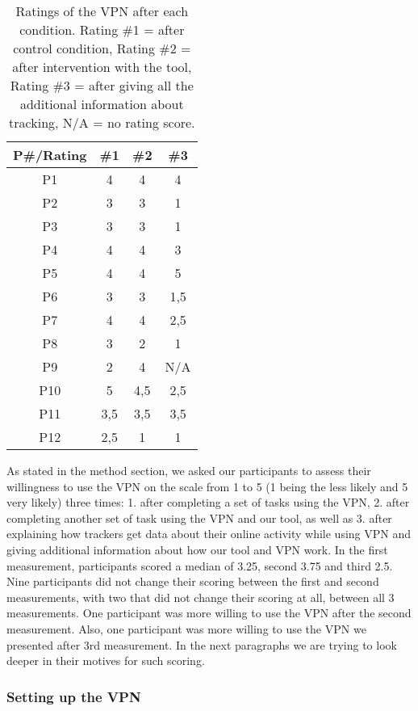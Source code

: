 \begin{table}[h!]
\centering
\begin{tabular}{|c c c c|} 
 \hline
P\#/Rating & \#1 & \#2 & \#3 \\
\hline
P1 & 4 & 4 & 4\\
P2 & 3 & 3 & 1\\
P3 & 3 & 3 & 1\\
P4 & 4 & 4 & 3\\
P5 & 4 & 4 & 5\\
P6 & 3 & 3 & 1,5\\
P7 & 4 & 4 & 2,5\\
P8 & 3 & 2 & 1\\
P9 & 2 & 4 & N/A\\
P10 & 5 & 4,5 & 2,5\\
P11 & 3,5 & 3,5 & 3,5\\
P12 & 2,5 & 1 & 1 \\
 \hline
\end{tabular}
\caption{Ratings of the VPN after each condition. Rating \#1 = after control condition, Rating \#2 = after intervention with the tool, Rating \#3 = after giving all the additional information about tracking, N/A = no rating score.}
\label{table:2}
\end{table}
As stated in the method section, we asked our participants to assess their
willingness to use the VPN on the scale from 1 to 5 (1 being the less likely
and 5 very likely) three times: 1.	after completing a set of tasks using the
VPN, 2.	after completing another set of task using the VPN and our tool, as
well as 3.	after explaining how trackers get data about their online activity
while using VPN and giving additional information about  how our tool and VPN
work.  In the first measurement, participants scored a median of 3.25, second
3.75 and third 2.5. Nine participants did not change their scoring between the
first and second measurements, with two that did not change their scoring at
all, between all 3 measurements. One participant was more willing to use the
VPN after the second measurement. Also, one participant was more willing to
use the VPN we presented after 3rd measurement.  In the next paragraphs we are
trying to look deeper in their motives for such scoring.  
    


\subsubsection{Setting up the VPN}


